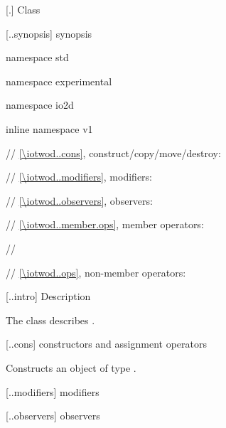  [\iotwod.] {Class \tcode{}}

 [\iotwod..synopsis] {\tcode{} synopsis}

\begin{codeblock}
namespace std { namespace experimental { namespace io2d { inline namespace v1 {
    // \ref{\iotwod..cons}, construct/copy/move/destroy:

    // \ref{\iotwod..modifiers}, modifiers:
    
    // \ref{\iotwod..observers}, observers:
    
    // \ref{\iotwod..member.ops}, member operators:
    
// \expos
  
  // \ref{\iotwod..ops}, non-member operators:
} } } }
\end{codeblock}

 [\iotwod..intro] {\tcode{} Description}

\pnum
\indexlibrary{\idxcode{}}
The class \tcode{} describes .

 [\iotwod..cons] {\tcode{} constructors and assignment operators}

\begin{itemdecl}
\end{itemdecl}
\begin{itemdescr}
	\pnum
	\effects
	Constructs an object of type \tcode{}.
	
	\pnum
	\postconditions
\end{itemdescr}

 [\iotwod..modifiers]{\tcode{} modifiers}

\indexlibrary{\idxcode{}!\idxcode{}}
\indexlibrary{\idxcode{}!\idxcode{}}
\begin{itemdecl}
\end{itemdecl}
\begin{itemdescr}
	\pnum
	\postconditions
	
\end{itemdescr}

 [\iotwod..observers]{\tcode{} observers}

\indexlibrary{\idxcode{}!\idxcode{}}
\indexlibrary{\idxcode{}!\idxcode{}}
\begin{itemdecl}
\end{itemdecl}
\begin{itemdescr}
	\pnum
	\returns

\end{itemdescr}

